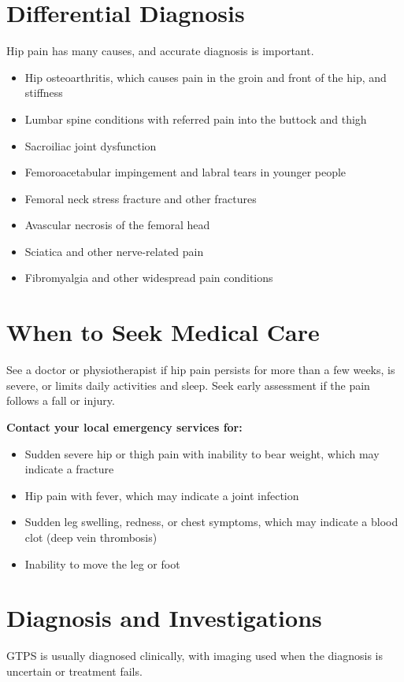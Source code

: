 \section*{Differential Diagnosis}
Hip pain has many causes, and accurate diagnosis is important.

\begin{itemize}
    \item Hip osteoarthritis, which causes pain in the groin and front of the hip, and stiffness
    \item Lumbar spine conditions with referred pain into the buttock and thigh
    \item Sacroiliac joint dysfunction
    \item Femoroacetabular impingement and labral tears in younger people
    \item Femoral neck stress fracture and other fractures
    \item Avascular necrosis of the femoral head
    \item Sciatica and other nerve-related pain
    \item Fibromyalgia and other widespread pain conditions
\end{itemize}

\section*{When to Seek Medical Care}
See a doctor or physiotherapist if hip pain persists for more than a few weeks, is severe, or limits daily activities and sleep. Seek early assessment if the pain follows a fall or injury.

\textbf{Contact your local emergency services for:}
\begin{itemize}
    \item Sudden severe hip or thigh pain with inability to bear weight, which may indicate a fracture
    \item Hip pain with fever, which may indicate a joint infection
    \item Sudden leg swelling, redness, or chest symptoms, which may indicate a blood clot (deep vein thrombosis)
    \item Inability to move the leg or foot
\end{itemize}

\section*{Diagnosis and Investigations}
GTPS is usually diagnosed clinically, with imaging used when the diagnosis is uncertain or treatment fails.

